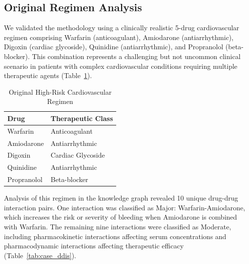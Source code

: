 \documentclass[11pt,a4paper]{article}
\begin{document}
\subsection{Original Regimen Analysis}

We validated the methodology using a clinically realistic 5-drug cardiovascular regimen comprising Warfarin (anticoagulant), Amiodarone (antiarrhythmic), Digoxin (cardiac glycoside), Quinidine (antiarrhythmic), and Propranolol (beta-blocker). This combination represents a challenging but not uncommon clinical scenario in patients with complex cardiovascular conditions requiring multiple therapeutic agents (Table~\ref{tab:original_regimen}).

\begin{table}[H]
\centering
\caption{Original High-Risk Cardiovascular Regimen}
\label{tab:original_regimen}
\begin{tabular}{ll}
\toprule
\textbf{Drug} & \textbf{Therapeutic Class} \\
\midrule
Warfarin & Anticoagulant \\
Amiodarone & Antiarrhythmic \\
Digoxin & Cardiac Glycoside \\
Quinidine & Antiarrhythmic \\
Propranolol & Beta-blocker \\
\bottomrule
\end{tabular}
\end{table}

Analysis of this regimen in the knowledge graph revealed 10 unique drug-drug interaction pairs. One interaction was classified as Major: Warfarin-Amiodarone, which increases the risk or severity of bleeding when Amiodarone is combined with Warfarin. The remaining nine interactions were classified as Moderate, including pharmacokinetic interactions affecting serum concentrations and pharmacodynamic interactions affecting therapeutic efficacy (Table~\ref{tab:case_ddis}).
\end{document}
